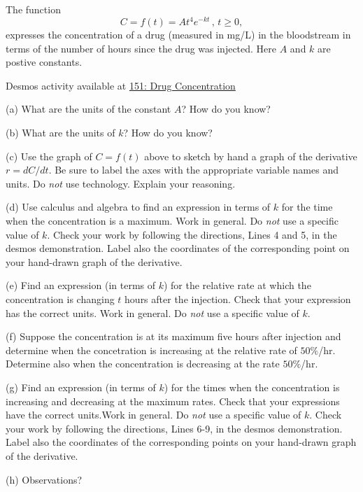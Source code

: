 \documentclass{ximera}
\begin{document}
\begin{question}  \label{Q:ds45t45ty}
The function 
\[
     C = f(t) = A t^4 e^{-kt} \, , \, t\geq 0, 
\]
expresses the concentration of a drug (measured in mg/L) in the bloodstream in terms of the number of hours since the drug was injected. Here $A$ and $k$ are postive constants. 

\begin{onlineOnly}
    \begin{center}
\end{center}
\end{onlineOnly}

Desmos activity available at \href{https://www.desmos.com/calculator/lvsxu3wa9a}{151: Drug Concentration}

(a) What are the units of the constant $A$? How do you know?

(b) What are the units of $k$? How do you know?

(c) Use the graph of $C=f(t)$ above to sketch by hand a graph of the derivative $r=dC/dt$. Be sure to label the axes with the appropriate variable names and units. Do \emph{not} use technology. Explain your reasoning.

(d) Use calculus and algebra to find an expression in terms of $k$ for the time when the concentration is a maximum. Work in general. Do \emph{not} use a specific value of $k$. Check your work by following the directions, Lines 4 and 5, in the desmos demonstration. Label also the coordinates of the corresponding point on your hand-drawn graph of the derivative.

(e) Find an expression (in terms of $k$) for the relative rate at which the concentration is changing $t$ hours after the injection. Check that your expression has the correct units. Work in general. Do \emph{not} use a specific value of $k$. 

(f) Suppose the concentration is at its maximum five hours after injection and determine when the concetration is increasing at the relative rate of $50\%$/hr. Determine also when the concentration is decreasing at the rate $50\%$/hr.

(g) Find an expression (in terms of $k$) for the times when the concentration is increasing and decreasing at the maximum rates. Check that your expressions have the correct units.Work in general. Do \emph{not} use a specific value of $k$. Check your work by following the directions, Lines 6-9, in the desmos demonstration. Label also the coordinates of the corresponding points on your hand-drawn graph of the derivative.



(h) Observations?

\end{question}
\end{document}
